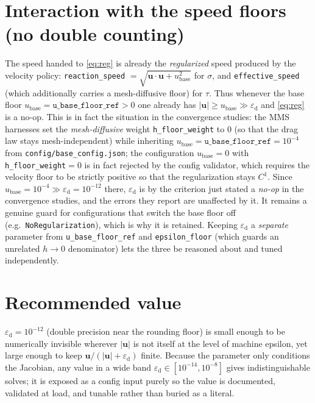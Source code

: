 \documentclass[11pt]{article}
\newcommand{\eps}{\varepsilon_{\mathrm{d}}}          %
\newcommand{\uu}{\bm{u}}
\newcommand{\norm}[1]{\lvert #1 \rvert}
\begin{document}
\section{Interaction with the speed floors (no double counting)}

The speed handed to \eqref{eq:reg} is already the \emph{regularized} speed produced by the velocity policy:
\texttt{reaction\_speed} $=\sqrt{\uu\cdot\uu+u_{\mathrm{base}}^2}$ for $\sigma$, and
\texttt{effective\_speed} (which additionally carries a mesh-diffusive floor) for $\tau$. Thus whenever the
base floor $u_{\mathrm{base}}=\texttt{u\_base\_floor\_ref}>0$ one already has $\norm{\uu}\ge u_{\mathrm{base}}\gg\eps$
and \eqref{eq:reg} is a no-op. This is in fact the situation in the convergence studies: the MMS
harnesses set the \emph{mesh-diffusive} weight \texttt{h\_floor\_weight} to $0$ (so that the drag law stays
mesh-independent) while inheriting $u_{\mathrm{base}}=\texttt{u\_base\_floor\_ref}=10^{-4}$ from
\texttt{config/base\_config.json}; the configuration $u_{\mathrm{base}}=0$ with
\texttt{h\_floor\_weight}$=0$ is in fact rejected by the config validator, which requires the velocity
floor to be strictly positive so that the regularization stays $C^1$. Since $u_{\mathrm{base}}=10^{-4}\gg
\eps=10^{-12}$ there, $\eps$ is by the criterion just stated a \emph{no-op} in the convergence studies,
and the errors they report are unaffected by it. It remains a genuine guard for configurations that switch
the base floor off (e.g.\ \texttt{NoRegularization}), which is why it is retained. Keeping $\eps$ a \emph{separate}
parameter from \texttt{u\_base\_floor\_ref} and \texttt{epsilon\_floor} (which guards an unrelated
$h\to0$ denominator) lets the three be reasoned about and tuned independently.

\section{Recommended value}

$\eps=10^{-12}$ (double precision near the rounding floor) is small enough to be numerically invisible
wherever $\norm{\uu}$ is not itself at the level of machine epsilon, yet large enough to keep
$\uu/(\norm{\uu}+\eps)$ finite. Because the parameter only conditions the Jacobian, any value in a wide
band $\eps\in[10^{-14},10^{-8}]$ gives indistinguishable solves; it is exposed as a config input purely so
the value is documented, validated at load, and tunable rather than buried as a literal.
\end{document}
